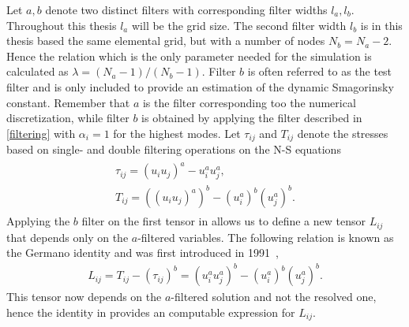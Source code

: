 Let $a,b$ denote two distinct filters with corresponding filter widths $l_a,l_b$. 
Throughout this thesis $l_a$ will be the grid size. The second filter width $l_b$ 
is in this thesis based the same elemental grid, but with a number of nodes $N_b = N_a - 2$.
Hence the relation which is the only parameter needed for the simulation is calculated as $\lambda = (N_a-1)/(N_b-1)$.
Filter $b$ is often referred to as the test filter and is only included to provide an estimation 
of the dynamic Smagorinsky constant. Remember that $a$ is the filter corresponding too the numerical discretization, while 
filter $b$ is obtained by applying the filter described in \cref{filtering} with $\alpha_i=1$ for the highest modes.
Let $\tau_{ij}$ and $T_{ij}$ denote the stresses based on single- and double filtering
operations on the N-S equations
\begin{align}
    \begin{split}
    \tau_{ij} = (u_iu_j)^a - u_i^au_j^a,\\
    T_{ij} = ((u_iu_j)^a)^b - (u_i^a)^b(u_j^a)^b.
    \end{split}
    \label{eq:stresstensors}
\end{align}
Applying the $b$ filter on the first tensor in  allows us to define 
a new tensor $L_{ij}$ that depends only on the $a$-filtered variables. The following relation
is known as the Germano identity and was first introduced in 1991~\cite{Germano91},
\begin{align}
    L_{ij} = T_{ij} - (\tau_{ij})^b
    = (u_i^au_j^a)^b - (u_i^a)^b(u_j^a)^b.
    \label{eq:germanoid}
\end{align}
This tensor now depends on the $a$-filtered solution and not the resolved 
one, hence the identity in  provides an computable expression for $L_{ij}$.


